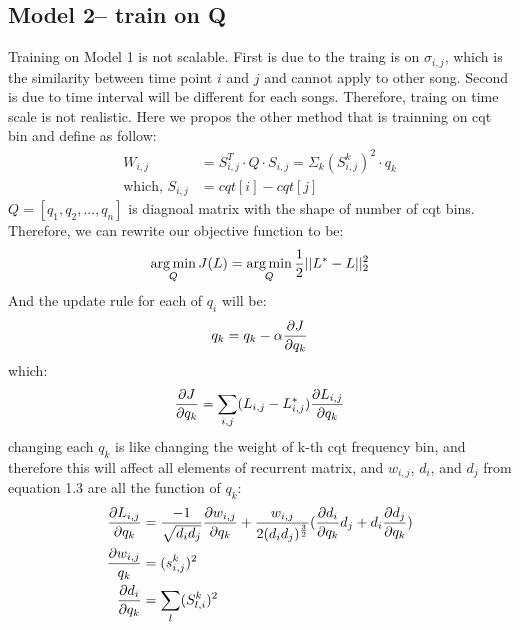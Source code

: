 \documentclass[final]{siamltexmm}
\DeclareMathOperator*{\argmin}{arg\,min} %
\begin{document}
\subsection{Model 2-- train on Q}
Training on Model 1 is not scalable. First is due to the traing is on $\sigma_{i,j}$, which is the similarity between time point $i$ and $j$ and cannot apply to other song. Second is due to time interval will be different for each songs. Therefore, traing on time scale is not realistic. Here we propos the other method that is trainning on cqt bin and define as follow:
\begin{equation}
\begin{aligned}
W_{i,j} &= S^T_{i,j} \cdot Q \cdot S_{i,j} = \Sigma_k (S^k_{i,j})^2 \cdot q_{k}\\
\text{which, } S_{i,j} &= cqt[i] - cqt[j]
\end{aligned}
\end{equation}
$Q = [q_1, q_2, ..., q_n]$ is diagnoal matrix with the shape of number of cqt bins. Therefore, we can rewrite our objective function to be:
\begin{equation}
\begin{aligned}
\argmin_Q J(L) = \argmin_Q {1\over 2}||L^{\ast} - L||^2_2
\end{aligned}
\end{equation}
And the update rule for each of $q_i$ will be:
\begin{equation}
\begin{aligned}
q_k = q_k - \alpha {\partial J \over \partial q_k}
\end{aligned}
\end{equation}
which:
\begin{equation}
\begin{aligned}
{\partial J \over \partial q_k} = \sum_{\substack{i,j}} (L_{i,j} - L_{i,j}^{\ast}) {\partial L_{i,j} \over \partial q_k}
\end{aligned}
\end{equation}
changing each $q_k$ is like changing the weight of k-th cqt frequency bin, and therefore this will affect all elements of recurrent matrix, and $w_{i,j}$, $d_i$, and $d_j$ from equation 1.3 are all the function of $q_k$:
\begin{equation}
\begin{aligned}
{\partial L_{i,j} \over \partial q_k} &= {-1 \over \sqrt{d_id_j}} {\partial w_{i,j}\over \partial q_k} + {w_{i,j} \over 2(d_id_j)^{3\over2}}({\partial d_i\over \partial q_k}d_j + d_i{\partial d_j\over \partial q_k})\\
{\partial w_{i,j} \over q_k} &= (s_{i,j}^k)^2 \\
{\partial d_i \over \partial q_k} &= \sum_{\substack{l}} (S_{l,i}^k)^2
\end{aligned}
\end{equation}
\end{document}

